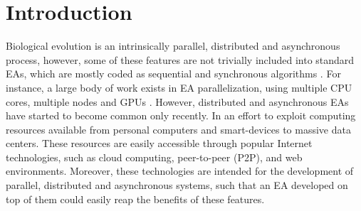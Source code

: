 \documentclass{llncs}
\begin{document}
\begin{abstract}




\end{abstract}
\section{Introduction}
Biological evolution is an intrinsically parallel, distributed and asynchronous process, however, 
some of these features are not trivially included into standard EAs,  which are mostly coded as sequential 
and synchronous algorithms \cite{eiben}. For instance, a large body of work exists in EA parallelization, 
using multiple CPU cores, multiple nodes and GPUs \cite{}.
However, distributed and asynchronous EAs have started to become common only recently. In an effort to
exploit computing resources available from personal computers and smart-devices to massive data centers.
These resources are easily accessible through popular Internet technologies, such as cloud computing, 
peer-to-peer (P2P), and web environments. Moreover, these technologies are intended for the development 
of parallel, distributed and asynchronous systems, such that an EA developed on top of them could easily 
reap the benefits of these features.
\end{document}
